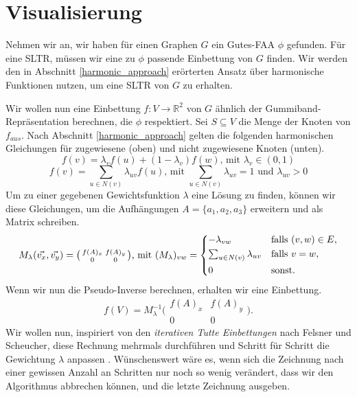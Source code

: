\section{Visualisierung}

Nehmen wir an, wir haben für einen Graphen $G$ ein Gutes-FAA $\phi$ gefunden. Für eine SLTR, müssen wir eine zu $\phi$ passende Einbettung von $G$ finden. Wir werden den in Abschnitt \ref{harmonic_approach} erörterten Ansatz über harmonische Funktionen nutzen, um eine SLTR von $G$ zu erhalten.

Wir wollen nun eine Einbettung $f:V\to \mathbb{R}^2$ von $G$ ähnlich der Gummiband-Repräsentation berechnen, die $\phi$ respektiert. Sei $S \subseteq V$ die Menge der Knoten von $f_{aus}$. Nach Abschnitt \ref{harmonic_approach} gelten die folgenden harmonischen Gleichungen für zugewiesene (oben) und nicht zugewiesene Knoten (unten).
$$ f(v) = \lambda_v f(u) + (1-\lambda_v)f(w) \text{, mit } \lambda_v \in (0,1) $$
$$ f(v) = \sum_{u \in N(v)} \lambda_{uv} f(u) \text{, mit }  \sum_{u \in N(v)}\lambda_{uv} = 1 \text{ und } \lambda_{uv} > 0 $$
Um zu einer gegebenen Gewichtsfunktion $\lambda$ eine Lösung zu finden, können wir diese Gleichungen, um die Aufhängungen $A = \{a_1,a_2,a_3\}$ erweitern und als Matrix schreiben.
\[ M_{\lambda}(\vec{v_x},\vec{v_y}) = \big( \begin{smallmatrix}f(A)_x&f(A)_y\\ 0&0\end{smallmatrix} \big) \text{, mit } (M_{\lambda})_{vw} =
	\begin{dcases}
	-\lambda_{vw} & \text{falls } (v,w) \in E, \\
	\textstyle\sum_{u \in N(v)} \lambda_{uv} & \text{falls } v = w, \\
	0 & \text{sonst.} \\
	\end{dcases}
\]
Wenn wir nun die Pseudo-Inverse berechnen, erhalten wir eine Einbettung.
$$f(V) = M_{\lambda}^{-1}\big( \begin{smallmatrix}f(A)_x&f(A)_y\\ 0&0\end{smallmatrix} \big).$$
Wir wollen nun, inspiriert von den \textit{iterativen Tutte Einbettungen} nach Felsner und Scheucher, diese Rechnung mehrmals durchführen und Schritt für Schritt die Gewichtung $\lambda$ anpassen \cite{fs17}. Wünschenswert wäre es, wenn sich die Zeichnung nach einer gewissen Anzahl an Schritten nur noch so wenig verändert, dass wir den Algorithmus abbrechen können, und die letzte Zeichnung ausgeben.

